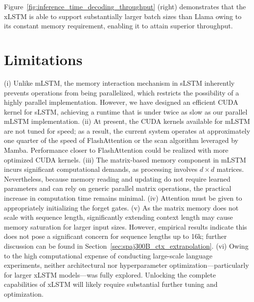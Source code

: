 Figure~\ref{fig:inference_time_decoding_throughput} (right) demonstrates that the xLSTM is able to support substantially larger batch sizes than Llama owing to its constant memory requirement, enabling it to attain superior throughput.

\section{Limitations}

(i) Unlike mLSTM, the memory interaction mechanism in sLSTM inherently prevents operations from being parallelized, which restricts the possibility of a highly parallel implementation. However, we have designed an efficient CUDA kernel for sLSTM, achieving a runtime that is under twice as slow as our parallel mLSTM implementation. (ii) At present, the CUDA kernels available for mLSTM are not tuned for speed; as a result, the current system operates at approximately one quarter of the speed of FlashAttention or the scan algorithm leveraged by Mamba. Performance closer to FlashAttention could be realized with more optimized CUDA kernels. (iii) The matrix-based memory component in mLSTM incurs significant computational demands, as processing involves $d \times d$ matrices. Nevertheless, because memory reading and updating do not require learned parameters and can rely on generic parallel matrix operations, the practical increase in computation time remains minimal. (iv) Attention must be given to appropriately initializing the forget gates. (v) As the matrix memory does not scale with sequence length, significantly extending context length may cause memory saturation for larger input sizes. However, empirical results indicate this does not pose a significant concern for sequence lengths up to 16k; further discussion can be found in Section~\ref{sec:spaj300B_ctx_extrapolation}. (vi) Owing to the high computational expense of conducting large-scale language experiments, neither architectural nor hyperparameter optimization—particularly for larger xLSTM models—was fully explored. Unlocking the complete capabilities of xLSTM will likely require substantial further tuning and optimization.

